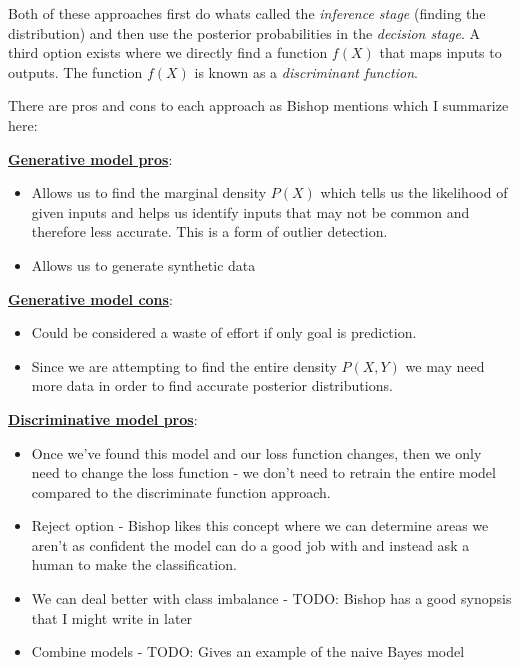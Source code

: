 Both of these approaches first do whats called the \emph{inference stage} (finding the distribution) and then use the posterior probabilities in the \emph{decision stage}. A third option exists where we directly find a function $f(X)$ that maps inputs to outputs. The function $f(X)$ is known as a \emph{discriminant function}.

There are pros and cons to each approach as Bishop mentions which I summarize here:
\break

\noindent \underline{\textbf{Generative model pros}}:
\begin{itemize}
\item Allows us to find the marginal density $P(X)$ which tells us the likelihood of given inputs and helps us identify inputs that may not be common and therefore less accurate. This is a form of outlier detection.
\item Allows us to generate synthetic data
\end{itemize}

\noindent \underline{\textbf{Generative model cons}}:
\begin{itemize}
\item Could be considered a waste of effort if only goal is prediction. 
\item Since we are attempting to find the entire density $P(X,Y)$ we may need more data in order to find accurate posterior distributions.
\end{itemize}

\noindent \underline{\textbf{Discriminative model pros}}:
\begin{itemize}
\item Once we've found this model and our loss function changes, then we only need to change the loss function - we don't need to retrain the entire model compared to the discriminate function approach.
\item Reject option - Bishop likes this concept where we can determine areas we aren't as confident the model can do a good job with and instead ask a human to make the classification.
\item We can deal better with class imbalance - TODO: Bishop has a good synopsis that I might write in later
\item Combine models - TODO: Gives an example of the naive Bayes model
\end{itemize}

